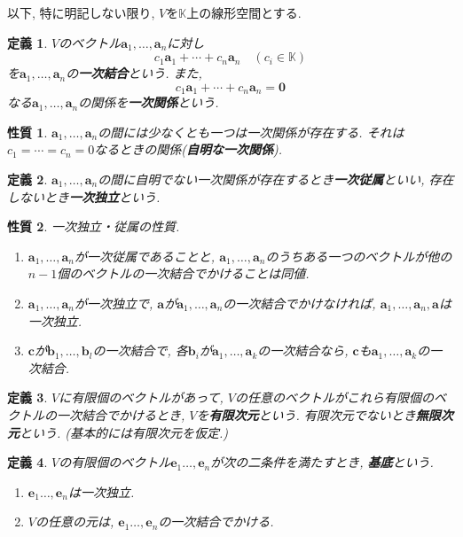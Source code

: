 \documentclass[a4j,dvipdfmx]{jsarticle}
\newcommand{\K}{\mathbb{K}}
\theoremstyle{mystyle}
\newtheorem*{definition}{定義}
\newtheorem*{property}{性質}
\begin{document}
    以下, 特に明記しない限り, $V$を$\K$上の線形空間とする.
    \begin{definition}
        $V$のベクトル$\bm{a}_1,\dots,\bm{a}_n$に対し
        \begin{equation*}
            c_1\bm{a}_1+\cdots+c_n\bm{a}_n\quad (c_i\in\K)
        \end{equation*}
        を$\bm{a}_1,\dots,\bm{a}_n$の\textbf{一次結合}という. また, 
        \begin{equation*}
            c_1\bm{a}_1+\cdots+c_n\bm{a}_n=\bm{0}
        \end{equation*}
        なる$\bm{a}_1,\dots,\bm{a}_n$の関係を\textbf{一次関係}という. 
    \end{definition}
    \begin{property}
        $\bm{a}_1,\dots,\bm{a}_n$の間には少なくとも一つは一次関係が存在する. それは$c_1=\cdots=c_n=0$なるときの関係(\textbf{自明な一次関係}).
    \end{property}
    \begin{definition}
        $\bm{a}_1,\dots,\bm{a}_n$の間に自明でない一次関係が存在するとき\textbf{一次従属}といい, 存在しないとき\textbf{一次独立}という.
    \end{definition}
    \begin{property} 
        一次独立・従属の性質.
        \begin{enumerate}
            \item $\bm{a}_1,\dots,\bm{a}_n$が一次従属であることと, $\bm{a}_1,\dots,\bm{a}_n$のうちある一つのベクトルが他の$n-1$個のベクトルの一次結合でかけることは同値.
            \item $\bm{a}_1,\dots,\bm{a}_n$が一次独立で, $\bm{a}$が$\bm{a}_1,\dots,\bm{a}_n$の一次結合でかけなければ, $\bm{a}_1,\dots,\bm{a}_n,\bm{a}$は一次独立.
            \item $\bm{c}$が$\bm{b}_1,\dots,\bm{b}_l$の一次結合で, 各$\bm{b}_i$が$\bm{a}_1,\dots,\bm{a}_k$の一次結合なら, $\bm{c}$も$\bm{a}_1,\dots,\bm{a}_k$の一次結合.
        \end{enumerate}
    \end{property}
    \clearpage
    \begin{definition}
        $V$に有限個のベクトルがあって, $V$の任意のベクトルがこれら有限個のベクトルの一次結合でかけるとき, $V$を\textbf{有限次元}という. 有限次元でないとき\textbf{無限次元}という. (基本的には有限次元を仮定.)
    \end{definition}
    \begin{definition}
        $V$の有限個のベクトル$\bm{e}_1\dots,\bm{e}_n$が次の二条件を満たすとき, \textbf{基底}という.
        \begin{enumerate}
            \item $\bm{e}_1\dots,\bm{e}_n$は一次独立.
            \item $V$の任意の元は, $\bm{e}_1\dots,\bm{e}_n$の一次結合でかける.
        \end{enumerate}
    \end{definition}
\end{document}
